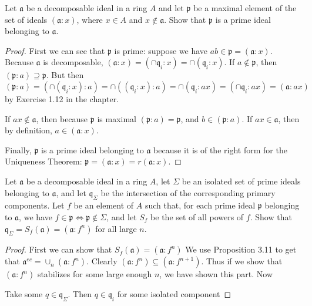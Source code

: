 \begin{exercise}
	Let $\mathfrak{a}$ be a decomposable ideal in a ring $A$ and let $\mathfrak{p}$ be a maximal element of the set of ideals $(\mathfrak{a} : x)$, where $x \in A$ and $x \notin \mathfrak{a}$. Show that $\mathfrak{p}$ is a prime ideal belonging to $\mathfrak{a}$. 
\end{exercise}
\begin{proof}
	First we can see that $\mathfrak{p} $ is prime: suppose we have $ab \in \mathfrak{p} = (\mathfrak{a}:x) $.
	Because $\mathfrak{a} $ is decomposable, $(\mathfrak{a}:x) = (\cap \mathfrak{q}_i:x) = \cap (\mathfrak{q}_i:x) $.
	If $a\notin \mathfrak{p} $, then $(\mathfrak{p}:a) \supseteq \mathfrak{p} $.
	But then $(\mathfrak{p}:a) = (\cap (\mathfrak{q}_i:x): a) = \cap ((\mathfrak{q}_i:x):a) = \cap (\mathfrak{q}_i:ax) = (\cap \mathfrak{q}_i:ax) = (\mathfrak{a}:ax)$ by Exercise 1.12 in the chapter.

	If $ax\notin \mathfrak{a} $, then because $\mathfrak{p} $ is maximal $(\mathfrak{p}:a) = \mathfrak{p} $, and $b \in (\mathfrak{p}:a) $.
	If $ax \in \mathfrak{a} $, then by definition, $a \in (\mathfrak{a}:x) $.

	Finally, $\mathfrak{p} $ is a prime ideal belonging to $\mathfrak{a} $ because it is of the right form for the Uniqueness Theorem: $\mathfrak{p} = (\mathfrak{a}:x) = r(\mathfrak{a}:x) $.
\end{proof}

\begin{exercise}
	Let $\mathfrak{a}$ be a decomposable ideal in a ring $A$, let $\Sigma$ be an isolated set of prime ideals belonging to $\mathfrak{a}$, and let $\mathfrak{q}_\Sigma$ be the intersection of the corresponding primary components. Let $f\!$ be an element of $A$ such that, for each prime ideal $\mathfrak{p}$ belonging to $\mathfrak{a}$, we have $f \!\in \mathfrak{p} \iff \mathfrak{p} \notin \Sigma$, and let $S_f\!$ be the set of all powers of $f\!$. Show that $\mathfrak{q}_\Sigma = S_f (\mathfrak{a}) = (\mathfrak{a} : f^n)$ for all large $n$. 
\end{exercise}
\begin{proof}
	First we can show that $S_f(\mathfrak{a}) = (\mathfrak{a}:f^{n})  $
	We use Proposition 3.11 to get that $\mathfrak{a}^{ec} = \cup_{n}(\mathfrak{a}:f^n)  $.
	Clearly $(\mathfrak{a}:f^n) \subseteq (\mathfrak{a}:f^{n+1})  $.
	Thus if we show that $(\mathfrak{a}:f^n) $ stabilizes for some large enough $n $, we have shown this part.
	Now 

	Take some $q \in \mathfrak{q}_\Sigma $.
	Then $q \in \mathfrak{q}_i $ for some isolated component
\end{proof}


